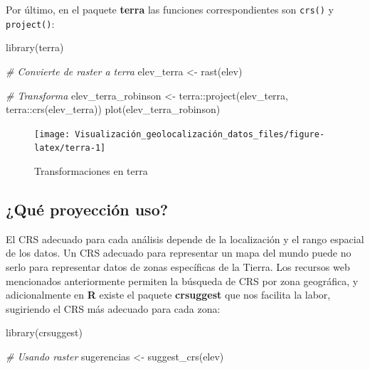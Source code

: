 \documentclass[
]{report}
\newenvironment{Shaded}{\begin{snugshade}}{\end{snugshade}}
\newcommand{\CommentTok}[1]{\textcolor[rgb]{0.56,0.35,0.01}{\textit{#1}}}
\newcommand{\FunctionTok}[1]{\textcolor[rgb]{0.00,0.00,0.00}{#1}}
\newcommand{\NormalTok}[1]{#1}
\newcommand{\OtherTok}[1]{\textcolor[rgb]{0.56,0.35,0.01}{#1}}
\newcommand{\SpecialCharTok}[1]{\textcolor[rgb]{0.00,0.00,0.00}{#1}}
\theoremstyle{definition}
\theoremstyle{definition}
\theoremstyle{definition}
\theoremstyle{definition}
\theoremstyle{remark}
\begin{document}
Por último, en el paquete \textbf{terra} \citep{R-terra} las funciones correspondientes
son \texttt{crs()} y \texttt{project()}:

\begin{Shaded}
\begin{Highlighting}[]
\FunctionTok{library}\NormalTok{(terra)}

\CommentTok{\# Convierte de raster a terra}
\NormalTok{elev\_terra }\OtherTok{\textless{}{-}} \FunctionTok{rast}\NormalTok{(elev)}


\CommentTok{\# Transforma}
\NormalTok{elev\_terra\_robinson }\OtherTok{\textless{}{-}}\NormalTok{ terra}\SpecialCharTok{::}\FunctionTok{project}\NormalTok{(elev\_terra, terra}\SpecialCharTok{::}\FunctionTok{crs}\NormalTok{(elev\_terra))}
\FunctionTok{plot}\NormalTok{(elev\_terra\_robinson)}
\end{Highlighting}
\end{Shaded}

\begin{figure}

{\centering \texttt{[image: Visualización\_geolocalización\_datos\_files/figure-latex/terra-1]} 

}

\caption{Transformaciones en terra}\label{fig:terra}
\end{figure}

\hypertarget{quecrsuso}{%
\subsection{¿Qué proyección uso?}\label{quecrsuso}}

El CRS adecuado para cada análisis depende de la localización y el rango
espacial de los datos. Un CRS adecuado para representar un mapa del mundo puede
no serlo para representar datos de zonas específicas de la Tierra. Los recursos
web mencionados anteriormente permiten la búsqueda de CRS por zona geográfica, y
adicionalmente en \textbf{R} existe el paquete \textbf{crsuggest} \citep{R-crsuggest} que nos
facilita la labor, sugiriendo el CRS más adecuado para cada zona:

\begin{Shaded}
\begin{Highlighting}[]
\FunctionTok{library}\NormalTok{(crsuggest)}

\CommentTok{\# Usando raster}
\NormalTok{sugerencias }\OtherTok{\textless{}{-}} \FunctionTok{suggest\_crs}\NormalTok{(elev)}
\end{Highlighting}
\end{Shaded}
\end{document}
